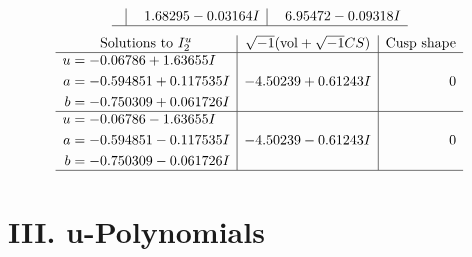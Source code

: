 \documentclass[1p]{elsarticle_modified}
\theoremstyle{definition}
\newcommand{\I}{\sqrt{-1}}
\begin{document}
$$\begin{array}{c|c|c}
 & \phantom{-}1.68295 - 0.03164 I & \phantom{-}6.95472 - 0.09318 I\\
 \hline 
 \end{array}$$\newpage$$\begin{array}{c|c|c}  
\text{Solutions to }I^u_{2}& \I (\text{vol} + \sqrt{-1}CS) & \text{Cusp shape}\\
 \hline 
\begin{aligned}
u &= -0.06786 + 1.63655 I \\
a &= -0.594851 + 0.117535 I \\
b &= -0.750309 + 0.061726 I\end{aligned}
 & -4.50239 + 0.61243 I & \phantom{-0.000000 } 0 \\ \hline\begin{aligned}
u &= -0.06786 - 1.63655 I \\
a &= -0.594851 - 0.117535 I \\
b &= -0.750309 - 0.061726 I\end{aligned}
 & -4.50239 - 0.61243 I & \phantom{-0.000000 } 0\\
 \hline 
 \end{array}$$\newpage
\newpage\renewcommand{\arraystretch}{1}
\centering \section*{ III. u-Polynomials}
\end{document}
